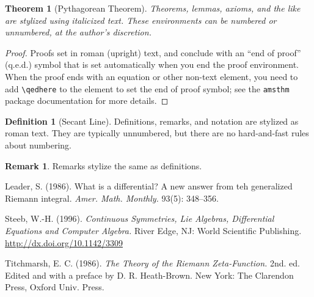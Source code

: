 \documentclass{article}
\theoremstyle{theorem}
\newtheorem{theorem}{Theorem}
\theoremstyle{definition}
\newtheorem*{definition}{Definition}
\newtheorem*{remark}{Remark}
\begin{document}
\begin{theorem}[Pythagorean Theorem]
Theorems, lemmas, axioms, and the like are stylized using italicized text. These environments can be numbered or unnumbered, at the author's discretion.
\end{theorem}

\begin{proof}
Proofs set in roman (upright) text, and conclude with an ``end of proof'' (q.e.d.) symbol that is set automatically when you end the proof environment.  When the proof ends with an equation or other non-text element, you need to add \verb~\qedhere~ to the element to set the end of proof symbol; see the \texttt{amsthm} package documentation for more details.
\end{proof}

\begin{definition}[Secant Line]
Definitions, remarks, and notation are stylized as roman text.  They are typically unnumbered, but there are no hard-and-fast rules about numbering.
\end{definition}

\begin{remark}
Remarks stylize the same as definitions.
\end{remark}

\begin{thebibliography}{3}

Leader, S. (1986). What is a differential? A new answer from teh generalized Riemann integral. {\it Amer. Math. Monthly.\/} 93(5): 348--356.

Steeb, W.-H. (1996). \textit{Continuous Symmetries, Lie Algebras, Differential Equations and Computer Algebra.\/} River Edge, NJ: World Scientific Publishing.  \href{http://dx.doi.org/10.1142/3309}{\url{http://dx.doi.org/10.1142/3309}}


Titchmarsh, E. C. (1986). {\it The Theory of the Riemann Zeta-Function.\/} 2nd. ed. Edited and with a preface by D. R. Heath-Brown. New York: The Clarendon Press, Oxford Univ. Press.

\end{thebibliography}
\end{document}
